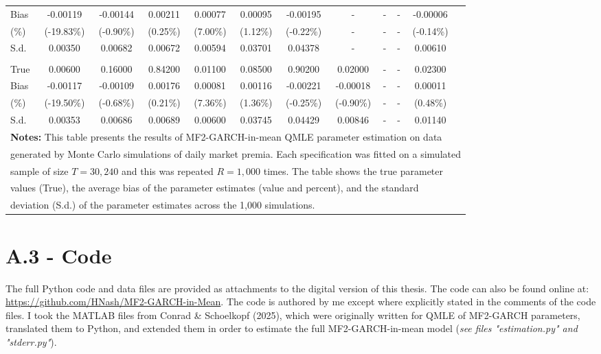 \documentclass[12pt]{article}
\begin{document}
\begin{table}[!ht]
{\begin{tabular}{lccccccccccc}
      Bias & -0.00119 & -0.00144 & 0.00211 & 0.00077 & 0.00095 & -0.00195 & - & - & - & -0.00006\\
      (\%)  & (-19.83\%) & (-0.90\%) & (0.25\%) & (7.00\%) & (1.12\%) & (-0.22\%) & - & - & - & (-0.14\%)\\
      S.d.  & 0.00350 & 0.00682 & 0.00672 & 0.00594 & 0.03701 & 0.04378 & - & - & - & 0.00610\\
      \addlinespace
      \multicolumn{12}{l}{\textbf{Non-Proportional}}\\
      True & 0.00600 & 0.16000 & 0.84200 & 0.01100 & 0.08500 & 0.90200 & 0.02000 & - & - & 0.02300\\
      Bias & -0.00117 & -0.00109 & 0.00176 & 0.00081 & 0.00116 & -0.00221 & -0.00018 & - & - & 0.00011\\
      (\%)  & (-19.50\%) & (-0.68\%) & (0.21\%) & (7.36\%) & (1.36\%) & (-0.25\%) & (-0.90\%) & - & - & (0.48\%)\\
      S.d.  & 0.00353 & 0.00686 & 0.00689 & 0.00600 & 0.03745 & 0.04429 & 0.00846 & - & - & 0.01140\\
      \midrule
      \multicolumn{12}{l}{\textbf{Notes:} This table presents the results of MF2-GARCH-in-mean QMLE parameter estimation on data}\\
      \multicolumn{12}{l}{generated by Monte Carlo simulations of daily market premia. Each specification was fitted on a simulated}\\
      \multicolumn{12}{l}{sample of size $T=30,240$ and this was repeated $R=1,000$ times. The table shows the true parameter}\\
      \multicolumn{12}{l}{values (True), the average bias of the parameter estimates (value and percent), and the standard}\\
      \multicolumn{12}{l}{deviation (S.d.) of the parameter estimates across the 1,000 simulations.}\\
      \bottomrule
    \end{tabular}%
  }
\end{table}

\pagebreak
\restoregeometry
{}
\section*{A.3 - Code}
The full Python code and data files are provided as attachments to the digital version of this thesis. The code can also be found online at: \url{https://github.com/HNash/MF2-GARCH-in-Mean}. The code is authored by me except where explicitly stated in the comments of the code files. I took the MATLAB files from Conrad \& Schoelkopf (2025), which were originally written for QMLE of MF2-GARCH parameters, translated them to Python, and extended them in order to estimate the full MF2-GARCH-in-mean model (\textit{see files "estimation.py" and "stderr.py"}).
\end{document}
